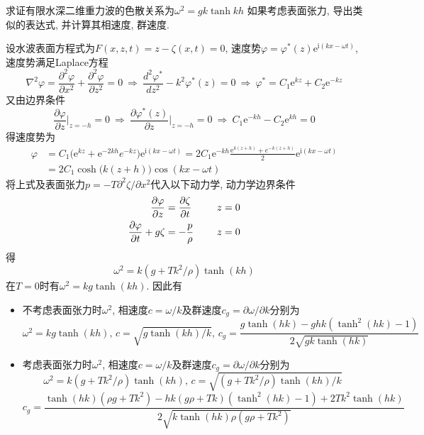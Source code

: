 \begin{problem}[习题3.1]
求证有限水深二维重力波的色散关系为$\omega^2=gk\tanh k h$ 如果考虑表面张力, 导出类似的表达式, 并计算其相速度, 群速度.
\end{problem}

\begin{solution}
设水波表面方程式为$F(x,z,t)=z-\zeta(x,t)=0$, 速度势$\varphi=\varphi^{*}(z)\mathrm{e}^{\mathrm{i}(kx-\omega t)}$,
速度势满足Laplace方程
\[
\nabla^{2}\varphi=\frac{\partial^{2}\varphi}{\partial x^{2}}+\frac{\partial^{2}\varphi}{\partial z^{2}}=0\:\Longrightarrow\:\frac{d^{2}\varphi^{*}}{dz^{2}}-k^{2}\varphi^{*}(z)=0\:\Longrightarrow\:\varphi^{*}=C_{1}\mathrm{e}^{kz}+C_{2}\mathrm{e}^{-kz}
\]
又由边界条件
\[
\frac{\partial\varphi}{\partial z}\Big|_{z=-h}=0\:\Longrightarrow\:\frac{\partial\varphi^{*}(z)}{\partial z}\Big|_{z=-h}=0\:\Longrightarrow\: C_{1}\mathrm{e}^{-kh}-C_{2}\mathrm{e}^{kh}=0
\]
得速度势为
\begin{align*}
\varphi & =C_{1}\Big(\mathrm{e}^{kz}+\mathrm{e}^{-2kh}e^{-kz}\Big)\mathrm{e}^{\mathrm{i}(kx-\omega t)}=2C_{1}\mathrm{e}^{-kh}\frac{\mathrm{e}^{k(z+h)}+e^{-k(z+h)}}{2}\mathrm{e}^{\mathrm{i}(kx-\omega t)}\\
 & =2C_{1}\cosh\big(k(z+h)\big)\cos(kx-\omega t)
\end{align*}
将上式及表面张力$p=-T\partial^{2}\zeta/\partial x^{2}$代入以下动力学, 动力学边界条件
\begin{align*}
\frac{\partial\varphi}{\partial z} & =\frac{\partial\zeta}{\partial t}\hphantom{-\frac{p}{\rho}}\quad z=0\\
\frac{\partial\varphi}{\partial t}+g\zeta & =-\frac{p}{\rho}\hphantom{\frac{\partial\zeta}{\partial t}}\quad z=0
\end{align*}
得
\[
\omega^{2}=k(g+Tk^{2}/\rho)\tanh(kh)
\]
在$T=0$时有$\omega^{2}=kg\tanh(kh)$. 因此有
\begin{itemize}
\item 不考虑表面张力时$\omega^{2}$, 相速度$c=\omega/k$及群速度$c_{g}=\partial\omega/\partial k$分别为
\[
\omega^{2}=kg\tanh(kh)
,\,
c=\sqrt{g\tanh(kh)/k}
,\,
c_{g}=\frac{g\tanh\left(hk\right)-ghk\left(\tanh^{2}\left(hk\right)-1\right)}{2\sqrt{gk\tanh\left(hk\right)}}
\]

\item 考虑表面张力时$\omega^{2}$, 相速度$c=\omega/k$及群速度$c_{g}=\partial\omega/\partial k$分别为
\[
\omega^{2}=k(g+Tk^{2}/\rho)\tanh(kh)
,\,
c=\sqrt{(g+Tk^{2}/\rho)\tanh(kh)/k}
\]
\[
c_{g}=\frac{\tanh\left(hk\right)\left(\rho g+Tk^{2}\right)-hk\left(g\rho+Tk\right)\left(\tanh^{2}\left(hk\right)-1\right)+2Tk^{2}\tanh\left(hk\right)}{2\sqrt{k\tanh\left(hk\right)\rho\left(g\rho+Tk^{2}\right)}}
\]
\end{itemize}
\end{solution} 
